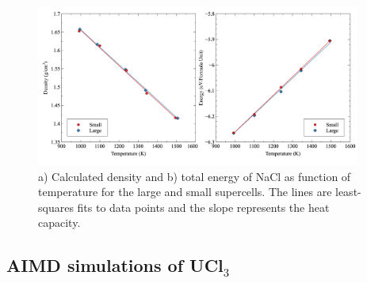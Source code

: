 \documentclass[preprint,3p,10pt,onecolumn,number,sort&compress]{elsarticle}
\begin{document}
\begin{figure}[htb]
\centering
\includegraphics[width=0.95\textwidth]{fig4.jpg}
\caption{a) Calculated density and b) total energy of NaCl as function of temperature for the large and small supercells. The lines are least-squares fits to data points and the slope represents the heat capacity.} 
\label{fig:NaClsize}
\end{figure}


\FloatBarrier

\subsection{AIMD simulations of UCl$_3$}
\end{document}
